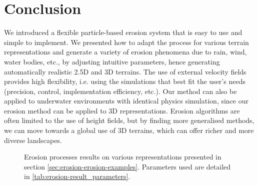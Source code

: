 \section{Conclusion}
\label{sec:erosion-conclusion}
We introduced a flexible particle-based erosion system that is easy to use and simple to implement. We presented how to adapt the process for various terrain representations and generate a variety of erosion phenomena due to rain, wind, water bodies, etc., by adjusting intuitive parameters, hence generating automatically realistic 2.5D and 3D terrains. The use of external velocity fields provides high flexibility, i.e. using the simulations that best fit the user's needs (precision, control, implementation efficiency, etc.).  
Our method can also be applied to underwater environments with identical physics simulation, since our erosion method can be applied to 3D representations.  
Erosion algorithms are often limited to the use of height fields, but by finding more generalised methods, we can move towards a global use of 3D terrains, which can offer richer and more diverse landscapes.

\clearpage
\begin{figure*}
	\centering
	\caption{Erosion processes results on various representations presented in section \cref{sec:erosion-erosion-examples}. Parameters used are detailed in \cref{tab:erosion-result_parameters}.}
	\label{tab:erosion-result_figures}
\end{figure*}
